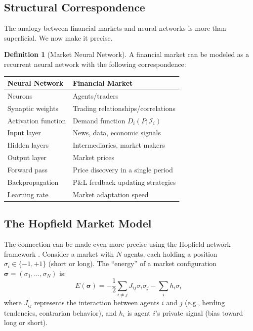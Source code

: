 \documentclass[12pt,a4paper]{article}
\theoremstyle{definition}
\newtheorem{definition}[theorem]{Definition}
\newcommand{\I}{\mathcal{I}}
\begin{document}
\subsection{Structural Correspondence}

The analogy between financial markets and neural networks is more than superficial. We now make it precise.

\begin{definition}[Market Neural Network]\label{def:market_nn}
A financial market can be modeled as a recurrent neural network with the following correspondence:
\begin{center}
\begin{tabular}{ll}
\toprule
\textbf{Neural Network} & \textbf{Financial Market} \\
\midrule
Neurons & Agents/traders \\
Synaptic weights & Trading relationships/correlations \\
Activation function & Demand function $D_i(P; \I_i)$ \\
Input layer & News, data, economic signals \\
Hidden layers & Intermediaries, market makers \\
Output layer & Market prices \\
Forward pass & Price discovery in a single period \\
Backpropagation & P\&L feedback updating strategies \\
Learning rate & Market adaptation speed \\
\bottomrule
\end{tabular}
\end{center}
\end{definition}

\subsection{The Hopfield Market Model}

The connection can be made even more precise using the Hopfield network framework \citep{hopfield1982}. Consider a market with $N$ agents, each holding a position $\sigma_i \in \{-1, +1\}$ (short or long). The ``energy'' of a market configuration $\boldsymbol{\sigma} = (\sigma_1, \ldots, \sigma_N)$ is:
\begin{equation}\label{eq:hopfield}
    E(\boldsymbol{\sigma}) = -\frac{1}{2} \sum_{i \neq j} J_{ij} \sigma_i \sigma_j - \sum_{i} h_i \sigma_i
\end{equation}
where $J_{ij}$ represents the interaction between agents $i$ and $j$ (e.g., herding tendencies, contrarian behavior), and $h_i$ is agent $i$'s private signal (bias toward long or short).
\end{document}
